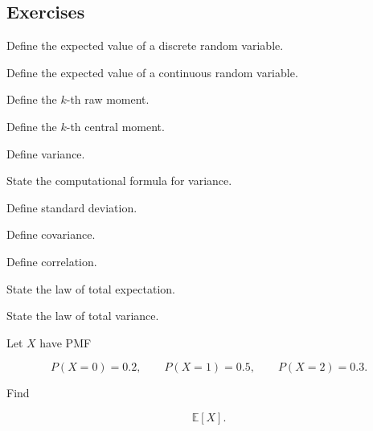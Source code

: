 \subsection{Exercises}
\label{subsec:expectation-moments-exercises}

\begin{exercise}[1]
Define the expected value of a discrete random variable.
\end{exercise}

\begin{exercise}[1]
Define the expected value of a continuous random variable.
\end{exercise}

\begin{exercise}[1]
Define the \(k\)-th raw moment.
\end{exercise}

\begin{exercise}[1]
Define the \(k\)-th central moment.
\end{exercise}

\begin{exercise}[1]
Define variance.
\end{exercise}

\begin{exercise}[1]
State the computational formula for variance.
\end{exercise}

\begin{exercise}[1]
Define standard deviation.
\end{exercise}

\begin{exercise}[1]
Define covariance.
\end{exercise}

\begin{exercise}[1]
Define correlation.
\end{exercise}

\begin{exercise}[1]
State the law of total expectation.
\end{exercise}

\begin{exercise}[1]
State the law of total variance.
\end{exercise}

\begin{exercise}[2]
Let \(X\) have PMF

\[
P(X=0)=0.2,
\qquad
P(X=1)=0.5,
\qquad
P(X=2)=0.3.
\]

Find

\[
\mathbb{E}[X].
\]
\end{exercise}

